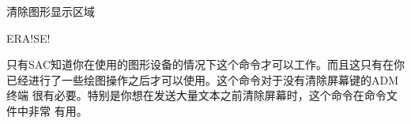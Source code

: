 \label{cmd:erase}

清除图形显示区域

\begin{SACSTX}
ERA!SE!
\end{SACSTX}

只有SAC知道你在使用的图形设备的情况下这个命令才可以工作。而且这只有在你
已经进行了一些绘图操作之后才可以使用。这个命令对于没有清除屏幕键的ADM终端
很有必要。特别是你想在发送大量文本之前清除屏幕时，这个命令在命令文件中非常
有用。
